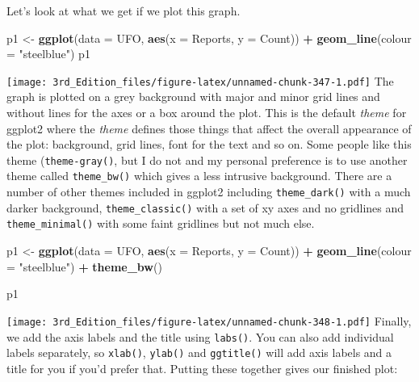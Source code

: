 \documentclass[
]{book}
\newenvironment{Shaded}{\begin{snugshade}}{\end{snugshade}}
\newcommand{\DataTypeTok}[1]{\textcolor[rgb]{0.13,0.29,0.53}{#1}}
\newcommand{\KeywordTok}[1]{\textcolor[rgb]{0.13,0.29,0.53}{\textbf{#1}}}
\newcommand{\NormalTok}[1]{#1}
\newcommand{\OperatorTok}[1]{\textcolor[rgb]{0.81,0.36,0.00}{\textbf{#1}}}
\newcommand{\StringTok}[1]{\textcolor[rgb]{0.31,0.60,0.02}{#1}}
\begin{document}
Let's look at what we get if we plot this graph.

\begin{Shaded}
\begin{Highlighting}[]
\NormalTok{p1 <-}\StringTok{ }\KeywordTok{ggplot}\NormalTok{(}\DataTypeTok{data =}\NormalTok{ UFO, }\KeywordTok{aes}\NormalTok{(}\DataTypeTok{x =}\NormalTok{ Reports, }
                             \DataTypeTok{y =}\NormalTok{ Count)) }\OperatorTok{+}
\StringTok{               }\KeywordTok{geom_line}\NormalTok{(}\DataTypeTok{colour =} \StringTok{"steelblue"}\NormalTok{)}
\NormalTok{p1}
\end{Highlighting}
\end{Shaded}

\texttt{[image: 3rd\_Edition\_files/figure-latex/unnamed-chunk-347-1.pdf]}
The graph is plotted on a grey background with major and minor grid lines and without lines for the axes or a box around the plot. This is the default \emph{theme} for ggplot2 where the \emph{theme} defines those things that affect the overall appearance of the plot: background, grid lines, font for the text and so on. Some people like this theme (\texttt{theme-gray()}, but I do not and my personal preference is to use another theme called \texttt{theme\_bw()} which gives a less intrusive background. There are a number of other themes included in ggplot2 including \texttt{theme\_dark()} with a much darker background, \texttt{theme\_classic()} with a set of xy axes and no gridlines and \texttt{theme\_minimal()} with some faint gridlines but not much else.

\begin{Shaded}
\begin{Highlighting}[]
\NormalTok{p1 <-}\StringTok{ }\KeywordTok{ggplot}\NormalTok{(}\DataTypeTok{data =}\NormalTok{ UFO, }\KeywordTok{aes}\NormalTok{(}\DataTypeTok{x =}\NormalTok{ Reports, }
                             \DataTypeTok{y =}\NormalTok{ Count)) }\OperatorTok{+}
\StringTok{               }\KeywordTok{geom_line}\NormalTok{(}\DataTypeTok{colour =} \StringTok{"steelblue"}\NormalTok{) }\OperatorTok{+}
\StringTok{               }\KeywordTok{theme_bw}\NormalTok{()}

\NormalTok{p1}
\end{Highlighting}
\end{Shaded}

\texttt{[image: 3rd\_Edition\_files/figure-latex/unnamed-chunk-348-1.pdf]}
Finally, we add the axis labels and the title using \texttt{labs()}. You can also add individual labels separately, so \texttt{xlab()}, \texttt{ylab()} and \texttt{ggtitle()} will add axis labels and a title for you if you'd prefer that. Putting these together gives our finished plot:
\end{document}
